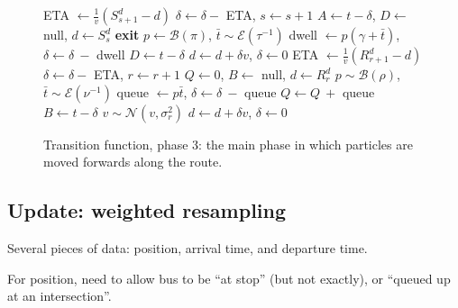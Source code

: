 \documentclass[draftcls,a4paper,onecolumn]{IEEEtran}\usepackage[]{graphicx}\usepackage[]{color}
\begin{document}
\begin{figure}[bt]
  \begin{algorithmic}
        \State ETA  $\gets \frac{1}{v} (S^d_{s+1} - d)$
          \State $\delta\gets \delta - $ ETA, $s \gets s + 1$
          \State $A \gets t - \delta$, $D\gets $ null, $d\gets S^d_s$
            \State\textbf{exit}
          \EndIf
          \State $p\gets \mathcal{B}(\pi)$, $\bar t \sim \mathcal{E}(\tau^{-1})$
          \State dwell $\gets p(\gamma + \bar t)$, $\delta\gets \delta\ - $ dwell
            \State $D\gets t - \delta$
          \EndIf
        \Else
          \State $d\gets d + \delta v$, $\delta \gets 0$
        \EndIf
      \Else
        \State ETA $\gets \frac{1}{v}(R^d_{r+1} - d)$
          \State $\delta\gets \delta - $ ETA, $r\gets r + 1$
          \State $Q \gets 0$, $B\gets $ null, $d\gets R^d_r$
          \State $p \sim \mathcal{B}(\rho)$, $\bar t \sim \mathcal{E}(\nu^{-1})$
          \State queue $\gets p\bar t$, $\delta\gets \delta\ - $ queue
          \State $Q\gets Q\ +$ queue
            \State $B\gets t - \delta$
            \State $v \sim \mathcal{N}(v, \sigma_r^2)$
          \EndIf
        \Else
          \State $d\gets d + \delta v$, $\delta \gets 0$
        \EndIf
      \EndIf
    \EndWhile
    \EndPhase
  \end{algorithmic}
  \caption{Transition function, phase 3: the main phase in which particles are moved forwards along the route.}
  \label{alg:transitionPhase3}
\end{figure}



\subsection{Update: weighted resampling}


Several pieces of data: position, arrival time, and departure time.

For position, need to allow bus to be ``at stop'' (but not exactly),
or ``queued up at an intersection''.
\end{document}
